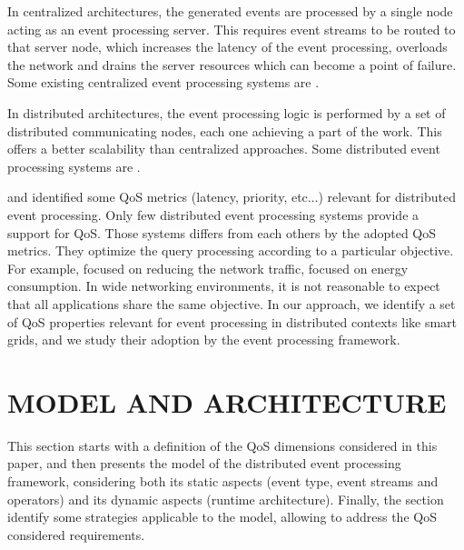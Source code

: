 \documentclass[a4paper,twoside]{article}
\begin{document}
In centralized architectures, the generated events are processed by a single node acting as an event processing server. This requires event streams to be routed to that server node, which increases the latency of the event processing, overloads the network and drains the server resources which can become a point of failure. Some existing centralized event processing systems are \cite{Esper,Gyllstrom2006,Demers2007,Luckham1996,Oracle}.

In distributed architectures, the event processing logic is performed by a set of distributed communicating nodes, each one achieving a part of the work. This offers a better scalability than centralized approaches. Some distributed event processing systems are \cite{Cugola2009,Saleh2013,Pietzuch2003,Streambase}.

\cite{Behnel2006} and \cite{Appel2010} identified some QoS metrics (latency, priority, etc...) relevant for distributed event processing. Only few distributed event processing systems provide a support for QoS. Those systems differs from each others by the adopted QoS metrics. They optimize the query processing according to a particular objective. For example, \cite{Cugola2009} focused on reducing the network traffic, \cite{Saleh2013} focused on energy consumption. In wide networking environments, it is not reasonable to expect that all applications share the same objective. In our approach, we identify a set of QoS properties relevant for event processing in distributed contexts like smart grids, and we study their adoption by the event processing framework. 
 

\section{\uppercase{Model and Architecture}}
\label{sec:model}
This section starts with a definition of the QoS dimensions considered in this paper, and then presents the model of the distributed event processing framework, considering both its static aspects (event type, event streams and operators) and its dynamic aspects (runtime architecture). Finally, the section identify some strategies applicable to the model, allowing to address the QoS considered requirements.
\end{document}
